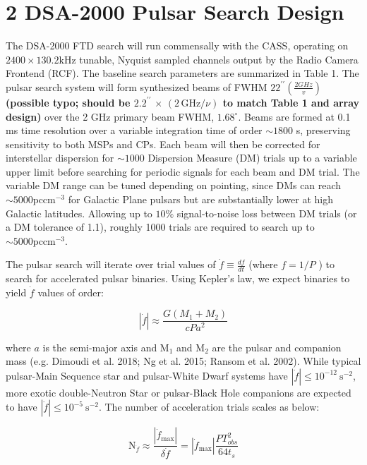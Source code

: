 \documentclass[10pt]{article}
\begin{document}
\section*{2 DSA-2000 Pulsar Search Design}
The DSA-2000 FTD search will run commensally with the CASS, operating on \(2400 \times 130.2 \mathrm{kHz}\) tunable, Nyquist sampled channels output by the Radio Camera Frontend (RCF). The baseline search parameters are summarized in Table 1. The pulsar search system will form synthesized beams of FWHM \(22^{\prime \prime}\left(\frac{2 G H z}{v}\right)\) \textbf{(possible typo; should be \(2.2^{\prime\prime}\,\times\,(2\,\mathrm{GHz}/\nu)\) to match Table 1 and array design)} over the 2 GHz primary beam FWHM, \(1.68^{\circ}\). Beams are formed at 0.1 ms time resolution over a variable integration time of order \(\sim 1800\) s, preserving sensitivity to both MSPs and CPs. Each beam will then be corrected for interstellar dispersion for \(\sim 1000\) Dispersion Measure (DM) trials up to a variable upper limit before searching for periodic signals for each beam and DM trial. The variable DM range can be tuned depending on pointing, since DMs can reach \(\sim 5000 \mathrm{pc} \mathrm{cm}^{-3}\) for Galactic Plane pulsars but are substantially lower at high Galactic latitudes. Allowing up to \(10 \%\) signal-to-noise loss between DM trials (or a DM tolerance of 1.1), roughly 1000 trials are required to search up to \(\sim 5000 \mathrm{pc} \mathrm{cm}^{-3}\).

The pulsar search will iterate over trial values of \(\dot{f} \equiv \frac{d f}{d t}\) (where \(f=1 / P\) ) to search for accelerated pulsar binaries. Using Kepler's law, we expect binaries to yield \(\dot{f}\) values of order:

\[
|\dot{f}| \approx \frac{G\left(M_{1}+M_{2}\right)}{c P a^{2}}
\]

where \(a\) is the semi-major axis and \(\mathrm{M}_{1}\) and \(\mathrm{M}_{2}\) are the pulsar and companion mass (e.g. Dimoudi et al. 2018; Ng et al. 2015; Ransom et al. 2002). While typical pulsar-Main Sequence star and pulsar-White Dwarf systems have \(|\dot{f}| \leq 10^{-12} \mathrm{~s}^{-2}\), more exotic double-Neutron Star or pulsar-Black Hole companions are expected to have \(|\dot{f}| \leq 10^{-5} \mathrm{~s}^{-2}\). The number of acceleration trials scales as below:

\[
\mathrm{N}_{\dot{f}} \approx \frac{\left|\dot{f}_{\max }\right|}{\delta \dot{f}}=\left|\dot{f}_{\max }\right| \frac{P T_{o b s}^{2}}{64 t_{s}}
\]
\end{document}
